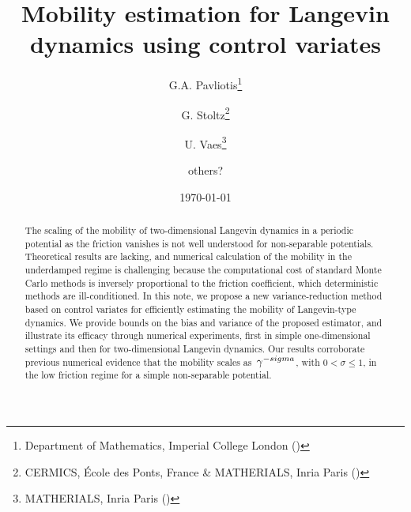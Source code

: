 \documentclass[11pt,a4paper]{article}
\date{\today}
\title{Mobility estimation for Langevin dynamics using control variates}
\author{%
  G.A. Pavliotis\thanks{Department of Mathematics, Imperial College London (\email{g.pavliotis@imperial.ac.uk})}%
  \hspace{2mm}\orcid{0000-0002-3468-9227}%
  \and G. Stoltz\thanks{CERMICS, \'Ecole des Ponts, France \& MATHERIALS, Inria Paris (\email{gabriel.stoltz@enpc.fr})}
  \hspace{2mm}\orcid{0000-0002-2797-5938}%
  \and U. Vaes\thanks{MATHERIALS, Inria Paris (\email{urbain.vaes@inria.fr})}%
  \hspace{2mm}\orcid{0000-0002-7629-7184}
  \and others?%
}
\theoremstyle{plain}
\numberwithin{equation}{section}
\renewcommand{\leq}{\leqslant}
\begin{document}
\maketitle

\begin{abstract}
    The scaling of the mobility of two-dimensional Langevin dynamics in a periodic potential as the friction vanishes is not well understood for non-separable potentials.
    Theoretical results are lacking,
    and numerical calculation of the mobility in the underdamped regime is challenging because
    the computational cost of standard Monte Carlo methods is inversely proportional to the friction coefficient,
    which deterministic methods are ill-conditioned.
    In this note, we propose a new variance-reduction method based on control variates for efficiently estimating the mobility of Langevin-type dynamics.
    We provide bounds on the bias and variance of the proposed estimator,
    and illustrate its efficacy through numerical experiments,
    first in simple one-dimensional settings
    and then for two-dimensional Langevin dynamics.
    Our results corroborate previous numerical evidence that
    the mobility scales as~$\gamma^{-\\sigma}$, with $0 < \sigma \leq 1$,
    in the low friction regime for a simple non-separable potential.
\end{abstract}
\end{document}
